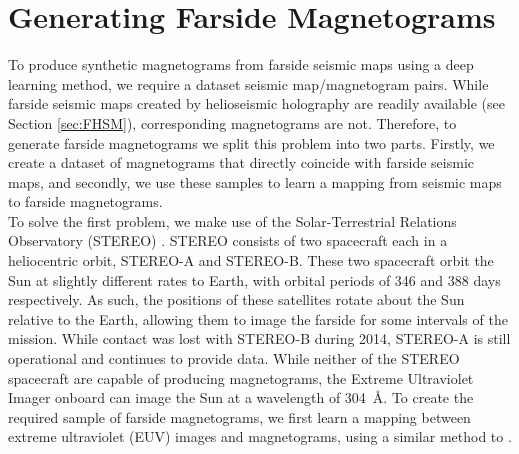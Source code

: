 \documentclass[11pt,a4paper,onecolumn]{report}
\begin{document}
\section{Generating Farside Magnetograms}
\label{sec:outlook}

To produce synthetic magnetograms from farside seismic maps using a deep
learning method, we require a dataset seismic map/magnetogram pairs. While
farside seismic maps created by helioseismic holography are readily available
(see Section \ref{sec:FHSM}), corresponding magnetograms are not. Therefore, to
generate farside magnetograms we split this problem into two parts. Firstly, we
create a dataset of magnetograms that directly coincide with farside seismic
maps, and secondly, we use these samples to learn a mapping from seismic
maps to farside magnetograms. \\

To solve the first problem, we make use of the Solar-Terrestrial Relations
Observatory (STEREO) \citep{kaiser_stereo_2008}. STEREO consists of two
spacecraft each in a heliocentric orbit, STEREO-A and STEREO-B. These two
spacecraft orbit the Sun at slightly different rates to Earth, with orbital
periods of 346 and 388 days respectively. As such, the positions of these
satellites rotate about the Sun relative to the Earth, allowing them to image
the farside for some intervals of the mission. While contact was lost with
STEREO-B during 2014, STEREO-A is still operational and continues to provide
data. While neither of the STEREO spacecraft are capable of producing
magnetograms, the Extreme Ultraviolet Imager onboard can image the Sun at a
wavelength of \SI{304}{\angstrom}. To create the required sample of farside
magnetograms, we first learn a mapping between extreme ultraviolet (EUV) images
and magnetograms, using a similar method to \citet{Kim2019}.\\
\end{document}
